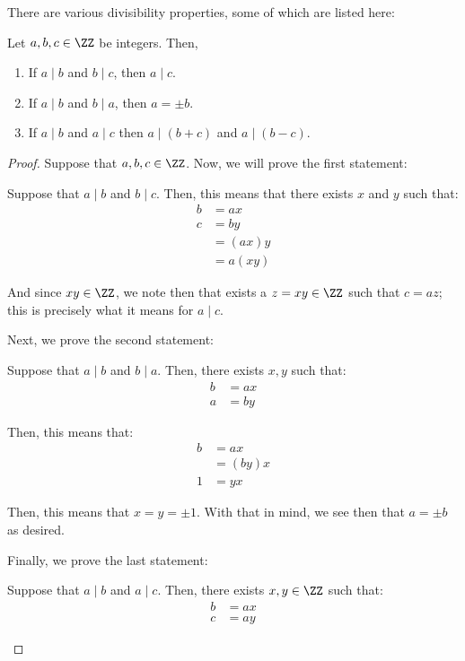 \documentclass[openany]{book}
\begin{document}
There are various divisibility properties, some of which are listed here:
\label{prop:1.7}\begin{prop}
	Let $a,b,c \in \ZZ$ be integers. Then,
	\begin{enumerate}
		\item If $a \mid b$ and $b \mid c$, then $a \mid c$.
		\item If $a \mid b$ and $b \mid a$, then $a = \pm b$.
		\item If $a \mid b$ and $a \mid c$ then $a \mid (b + c)$ and $a \mid (b - c)$.
	\end{enumerate}
\end{prop}
\begin{proof}
	Suppose that $a, b, c \in \ZZ$. Now, we will prove the first statement:
	\begin{innerproof}
		Suppose that $a \mid b$ and $b \mid c$. Then, this means that there exists $x$ and $y$ such that:
		\begin{align*}
			b &= ax \\
			c &= by \\
			&= (ax)y \\
			&= a(xy)
		\end{align*}
		
		And since $xy \in \ZZ$, we note then that exists a $z = xy \in \ZZ$ such that $c = az$; this is precisely what it means for $a \mid c$.
	\end{innerproof}
	
	Next, we prove the second statement:
	\begin{innerproof}
		Suppose that $a \mid b$ and $b \mid a$. Then, there exists $x, y$ such that:
		\begin{align*}
			b &= ax \\
			a &= by
		\end{align*}
		
		Then, this means that:
		\begin{align*}
			b &= ax \\
			&= (by)x \\
			1 &= yx
		\end{align*}
		
		Then, this means that $x = y = \pm 1$. With that in mind, we see then that $a = \pm b$ as desired.
	\end{innerproof}
	
	Finally, we prove the last statement:
	\begin{innerproof}
		Suppose that $a \mid b$ and $a \mid c$. Then, there exists $x, y \in \ZZ$ such that:
		\begin{align*}
			b &= ax \\
			c &= ay
		\end{align*}
		

\end{innerproof}
\end{proof}
\end{document}
